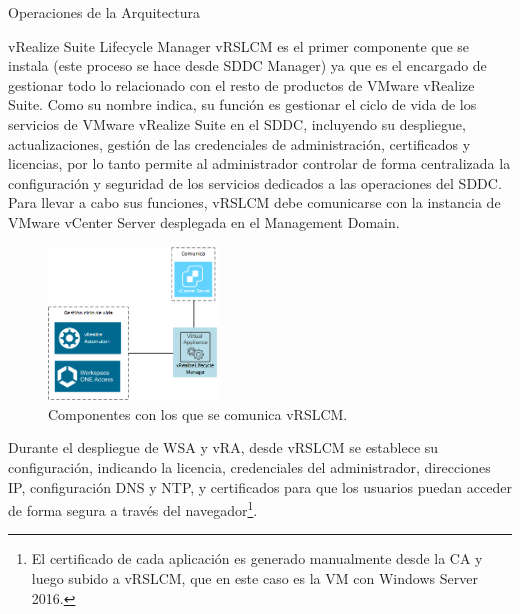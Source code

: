 \begin{subsection}{Operaciones de la Arquitectura}
    \begin{subsubsection}{vRealize Suite Lifecycle Manager}
        vRSLCM es el primer componente que se instala (este proceso se hace desde SDDC Manager) ya que es el encargado de gestionar todo lo relacionado con el resto de productos de VMware vRealize Suite. Como su nombre indica, su función es gestionar el ciclo de vida de los servicios de VMware vRealize Suite en el SDDC, incluyendo su despliegue, actualizaciones, gestión de las credenciales de administración, certificados y licencias, por lo tanto permite al administrador controlar de forma centralizada la configuración y seguridad de los servicios dedicados a las operaciones del SDDC. Para llevar a cabo sus funciones, vRSLCM debe comunicarse con la instancia de VMware vCenter Server desplegada en el Management Domain.
        \begin{figure}[h]
            \centering
            \includegraphics[width=0.4\textwidth]{imaxes/pruebaconcepto/vrealize/diseno-vrlscm.png}
            \caption{Componentes con los que se comunica vRSLCM.}
            \label{fig:vrealize-components}
        \end{figure}
        \FloatBarrier        
        Durante el despliegue de WSA y vRA, desde vRSLCM se establece su configuración, indicando la licencia, credenciales del administrador, direcciones IP, configuración DNS y NTP, y certificados para que los usuarios puedan acceder de forma segura a través del navegador\footnote{El certificado de cada aplicación es generado manualmente desde la CA y luego subido a vRSLCM, que en este caso es la VM con Windows Server 2016.}. 

\end{subsubsection}
\end{subsection}

